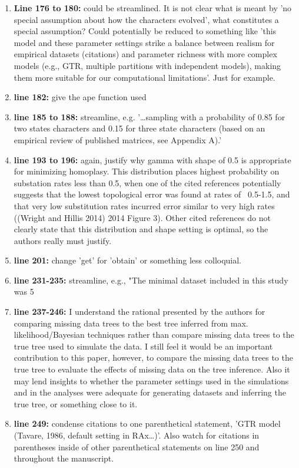 \documentclass[12pt,letterpaper]{article}
\begin{document}
\begin{enumerate}
\item{\textbf{Line 176 to 180:}} could be streamlined. It is not clear what is meant by 'no special assumption about how the characters evolved', what constitutes a special assumption? Could potentially be reduced to something like 'this model and these parameter settings strike a balance between realism for empirical datasets (citations) and parameter richness with more complex models (e.g., GTR, multiple partitions with independent models), making them more suitable for our computational limitations'. Just for example.
\item{\textbf{line 182:}} give the ape function used
\item{\textbf{line 185 to 188:}} streamline, e.g. '…sampling with a probability of 0.85 for two states characters and 0.15 for three state characters (based on an empirical review of published matrices, see Appendix A).'
\item{\textbf{line 193 to 196:}} again, justify why gamma with shape of 0.5 is appropriate for minimizing homoplasy. This distribution places highest probability on substation rates less than 0.5, when one of the cited references potentially suggests that the lowest topological error was found at rates of ~0.5-1.5, and that very low substitution rates incurred error similar to very high rates ((Wright and Hillis 2014) 2014 Figure 3). Other cited references do not clearly state that this distribution and shape setting is optimal, so the authors really must justify. 
\item{\textbf{line 201:}} change 'get' for 'obtain' or something less colloquial. 
\item{\textbf{line 231-235:}} streamline, e.g., "The minimal dataset included in this study was 5%
\item{\textbf{line 237-246:}} I understand the rational presented by the authors for comparing missing data trees to the best tree inferred from max. likelihood/Bayesian techniques rather than compare missing data trees to the true tree used to simulate the data. I still feel it would be an important contribution to this paper, however, to compare the missing data trees to the true tree to evaluate the effects of missing data on the tree inference. Also it may lend insights to whether the parameter settings used in the simulations and in the analyses were adequate for generating datasets and inferring the true tree, or something close to it. 
\item{\textbf{line 249:}} condense citations to one parenthetical statement, 'GTR model (Tavare, 1986, default setting in RAx…)'. Also watch for citations in parentheses inside of other parenthetical statements on line 250 and throughout the manuscript. 

\end{enumerate}
\end{document}
